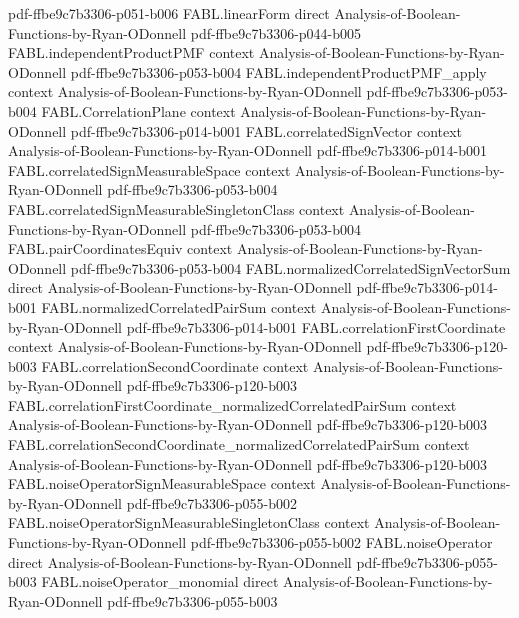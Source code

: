 \begin{theorem}
  {pdf-ffbe9c7b3306-p051-b006}
\proofstep
  {FABL.linearForm}
  {direct}
  {Analysis-of-Boolean-Functions-by-Ryan-ODonnell}
  {pdf-ffbe9c7b3306-p044-b005}
\proofstep
  {FABL.independentProductPMF}
  {context}
  {Analysis-of-Boolean-Functions-by-Ryan-ODonnell}
  {pdf-ffbe9c7b3306-p053-b004}
\proofstep
  {FABL.independentProductPMF_apply}
  {context}
  {Analysis-of-Boolean-Functions-by-Ryan-ODonnell}
  {pdf-ffbe9c7b3306-p053-b004}
\proofstep
  {FABL.CorrelationPlane}
  {context}
  {Analysis-of-Boolean-Functions-by-Ryan-ODonnell}
  {pdf-ffbe9c7b3306-p014-b001}
\proofstep
  {FABL.correlatedSignVector}
  {context}
  {Analysis-of-Boolean-Functions-by-Ryan-ODonnell}
  {pdf-ffbe9c7b3306-p014-b001}
\proofstep
  {FABL.correlatedSignMeasurableSpace}
  {context}
  {Analysis-of-Boolean-Functions-by-Ryan-ODonnell}
  {pdf-ffbe9c7b3306-p053-b004}
\proofstep
  {FABL.correlatedSignMeasurableSingletonClass}
  {context}
  {Analysis-of-Boolean-Functions-by-Ryan-ODonnell}
  {pdf-ffbe9c7b3306-p053-b004}
\proofstep
  {FABL.pairCoordinatesEquiv}
  {context}
  {Analysis-of-Boolean-Functions-by-Ryan-ODonnell}
  {pdf-ffbe9c7b3306-p053-b004}
\proofstep
  {FABL.normalizedCorrelatedSignVectorSum}
  {direct}
  {Analysis-of-Boolean-Functions-by-Ryan-ODonnell}
  {pdf-ffbe9c7b3306-p014-b001}
\proofstep
  {FABL.normalizedCorrelatedPairSum}
  {context}
  {Analysis-of-Boolean-Functions-by-Ryan-ODonnell}
  {pdf-ffbe9c7b3306-p014-b001}
\proofstep
  {FABL.correlationFirstCoordinate}
  {context}
  {Analysis-of-Boolean-Functions-by-Ryan-ODonnell}
  {pdf-ffbe9c7b3306-p120-b003}
\proofstep
  {FABL.correlationSecondCoordinate}
  {context}
  {Analysis-of-Boolean-Functions-by-Ryan-ODonnell}
  {pdf-ffbe9c7b3306-p120-b003}
\proofstep
  {FABL.correlationFirstCoordinate_normalizedCorrelatedPairSum}
  {context}
  {Analysis-of-Boolean-Functions-by-Ryan-ODonnell}
  {pdf-ffbe9c7b3306-p120-b003}
\proofstep
  {FABL.correlationSecondCoordinate_normalizedCorrelatedPairSum}
  {context}
  {Analysis-of-Boolean-Functions-by-Ryan-ODonnell}
  {pdf-ffbe9c7b3306-p120-b003}
\proofstep
  {FABL.noiseOperatorSignMeasurableSpace}
  {context}
  {Analysis-of-Boolean-Functions-by-Ryan-ODonnell}
  {pdf-ffbe9c7b3306-p055-b002}
\proofstep
  {FABL.noiseOperatorSignMeasurableSingletonClass}
  {context}
  {Analysis-of-Boolean-Functions-by-Ryan-ODonnell}
  {pdf-ffbe9c7b3306-p055-b002}
\proofstep
  {FABL.noiseOperator}
  {direct}
  {Analysis-of-Boolean-Functions-by-Ryan-ODonnell}
  {pdf-ffbe9c7b3306-p055-b003}
\proofstep
  {FABL.noiseOperator_monomial}
  {direct}
  {Analysis-of-Boolean-Functions-by-Ryan-ODonnell}
  {pdf-ffbe9c7b3306-p055-b003}

\end{theorem}
